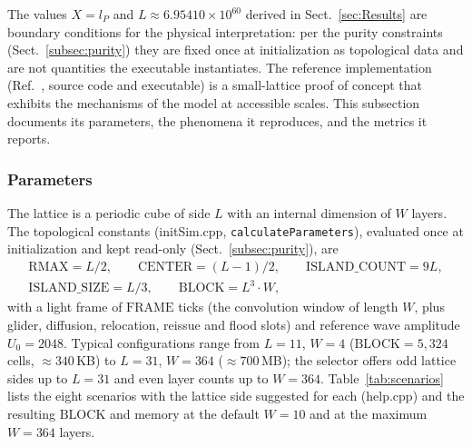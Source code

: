 \documentclass{ijuc}
\begin{document}
The values $X=l_{P}$ and $L\approx6.95410\times10^{60}$ derived in Sect.~\ref{sec:Results} are boundary conditions for the physical interpretation: per the purity constraints (Sect.~\ref{subsec:purity}) they are fixed once at initialization as topological data and are not quantities the executable instantiates.  The reference implementation (Ref.~\cite{af_neto}, source code and executable) is a small-lattice proof of concept that exhibits the mechanisms of the model at accessible scales.  This subsection documents its parameters, the phenomena it reproduces, and the metrics it reports.

\subsubsection{Parameters}\label{subsubsec:parameters}

The lattice is a periodic cube of side $L$ with an internal dimension of $W$ layers.  The topological constants (initSim.cpp, \texttt{calculateParameters}), evaluated once at initialization and kept read-only (Sect.~\ref{subsec:purity}), are
\begin{multline*}
\mathrm{RMAX}=L/2,\qquad \mathrm{CENTER}=(L-1)/2,\qquad
\mathrm{ISLAND\_COUNT}=9L,\\
\mathrm{ISLAND\_SIZE}=L/3,\qquad \mathrm{BLOCK}=L^{3}\cdot W,
\end{multline*}
with a light frame of $\mathrm{FRAME}$ ticks (the convolution window of length $W$, plus glider, diffusion, relocation, reissue and flood slots) and reference wave amplitude $U_{0}=2048$.  Typical configurations range from $L=11$, $W=4$ ($\mathrm{BLOCK}=5{,}324$ cells, $\approx 340$\,KB) to $L=31$, $W=364$ ($\approx 700$\,MB); the selector offers odd lattice sides up to $L=31$ and even layer counts up to $W=364$.  Table~\ref{tab:scenarios} lists the eight scenarios with the lattice side suggested for each (help.cpp) and the resulting $\mathrm{BLOCK}$ and memory at the default $W=10$ and at the maximum $W=364$ layers.
\end{document}
